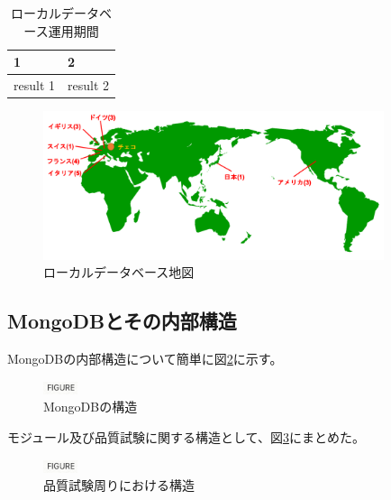 \begin{table}[tbp]
\begin{center}
\caption[ローカルデータベース運用期間]{ローカルデータベース運用期間}
\label{localdb_world_site}
  \begin{tabular}{|ll|} \hline
    1 & 2 \\ \hline
    result 1 & result 2 \\ \hline 
  \end{tabular}
\end{center}
\end{table}

\begin{figure}[bpt]\centering
\includegraphics[width=10cm]{localdb_world_map}
\caption[ローカルデータベース地図]{ローカルデータベース地図}
\label{localdb_world_map}
\end{figure}

\subsection{MongoDBとその内部構造}
MongoDBの内部構造について簡単に図\ref{mongodb_schema}に示す。

\begin{figure}[bpt]\centering
\includegraphics[width=1cm]{figure}
\caption[MongoDBの構造]{MongoDBの構造}
\label{mongodb_schema}
\end{figure}

モジュール及び品質試験に関する構造として、図\ref{localdb_mongodb_structure}にまとめた。

\begin{figure}[bpt]\centering
\includegraphics[width=1cm]{figure}
\caption[品質試験周りにおける]{品質試験周りにおける構造}
\label{localdb_mongodb_structure}
\end{figure}

